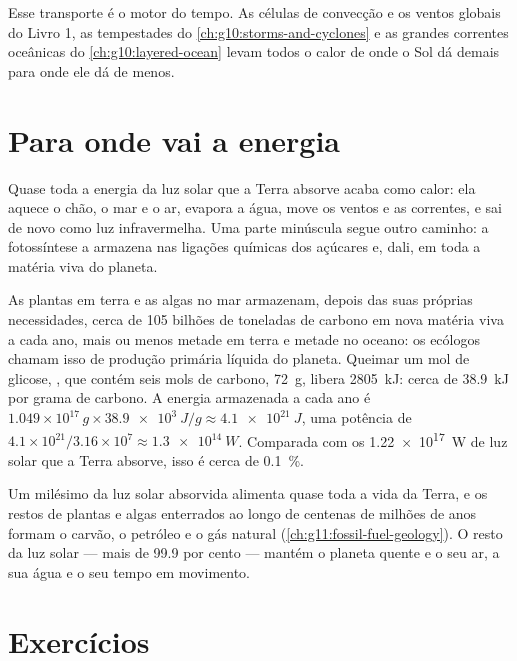 Esse transporte é o motor do tempo. As células de convecção e os ventos
globais do Livro 1, as tempestades do \cref{ch:g10:storms-and-cyclones} e
as grandes correntes oceânicas do \cref{ch:g10:layered-ocean} levam todos o
calor de onde o Sol dá demais para onde ele dá de menos.

\section{Para onde vai a energia}

Quase toda a energia da luz solar que a Terra absorve acaba como calor: ela
aquece o chão, o mar e o ar, evapora a água, move os ventos e as correntes,
e sai de novo como luz infravermelha. Uma parte minúscula segue outro
caminho: a fotossíntese a armazena nas ligações químicas dos açúcares e,
dali, em toda a matéria viva do planeta.

\begin{example}\label{ex:g10:earth-energy-budget:photosynthesis}
As plantas em terra e as algas no mar armazenam, depois das suas próprias
necessidades, cerca de \num{105} bilhões de toneladas de carbono em nova
matéria viva a cada ano, mais ou menos metade em terra e metade no oceano:
os ecólogos chamam isso de produção primária líquida do planeta. Queimar um
mol de glicose, , que contém seis mols de carbono,
\qty{72}{g}, libera \qty{2805}{kJ}: cerca de \qty{38.9}{kJ} por grama de
carbono. A energia armazenada a cada ano é
$1.049\times10^{17}\,\unit{g} \times \qty{38.9e3}{J/g} \approx
\qty{4.1e21}{J}$, uma potência de $4.1\times10^{21}/3.16\times10^{7} \approx
\qty{1.3e14}{W}$. Comparada com os \qty{1.22e17}{W} de luz solar que a Terra
absorve, isso é cerca de \qty{0.1}{\percent}.
\end{example}

\begin{remark}\label{rem:g10:earth-energy-budget:life}
Um milésimo da luz solar absorvida alimenta quase toda a vida da Terra, e os
restos de plantas e algas enterrados ao longo de centenas de milhões de anos
formam o carvão, o petróleo e o gás natural
(\cref{ch:g11:fossil-fuel-geology}). O resto da luz solar --- mais de 99.9
por cento --- mantém o planeta quente e o seu ar, a sua água e o seu tempo
em movimento.
\end{remark}

\section{Exercícios}

